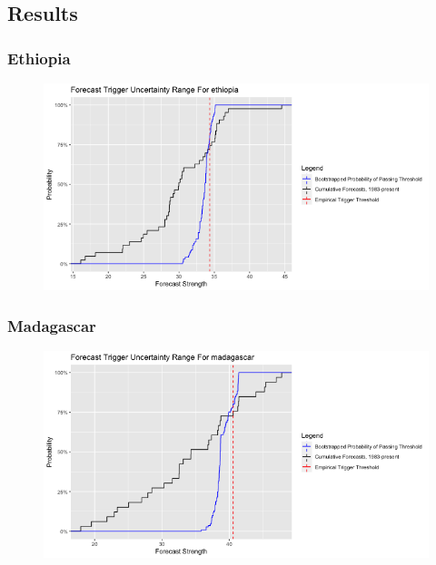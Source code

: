 \documentclass{ametsocV5}
\begin{document}
\subsection{Results}





\subsubsection{Ethiopia}

\begin{figure}
    \centering
    \includegraphics[width=0.9\linewidth]{figures/ethiopia.png}
\end{figure}

\subsubsection{Madagascar}

\begin{figure}
    \centering
    \includegraphics[width=0.9\linewidth]{figures/madagascar.png}
\end{figure}
\end{document}
